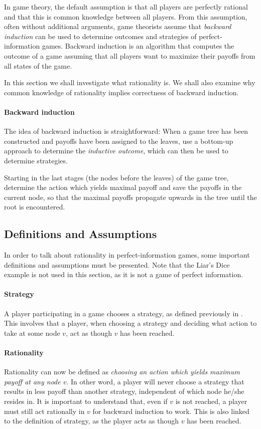 In game theory, the default assumption is that all players are perfectly rational and that this is common knowledge between all players. From this assumption, often without additional arguments, game theorists assume that \emph{backward induction} can be used to determine outcomes and strategies of perfect-information games. Backward induction is an algorithm that computes the outcome of a game assuming that all players want to maximize their payoffs from all states of the game.

In this section we shall investigate what rationality is. We shall also examine why common knowledge of rationality implies correctness of backward induction.

\paragraph*{Backward induction}
The idea of backward induction is straightforward: When a game tree has been constructed and payoffs have been assigned to the leaves, use a bottom-up approach to determine the \emph{inductive outcome}, which can then be used to determine strategies. 

Starting in the last stages (the nodes before the leaves) of the game tree, determine the action which yields maximal payoff and save the payoffs in the current node, so that the maximal payoffs propagate upwards in the tree until the root is encountered.

\subsection{Definitions and Assumptions}
In order to talk about rationality in perfect-information games, some important definitions and assumptions must be presented. Note that the Liar's Dice example is not used in this section, as it is not a game of perfect information.

\paragraph*{Strategy} A player participating in a game chooses a strategy, as defined previously in . This involves that a player, when choosing a strategy and deciding what action to take at some node $v$, act as though $v$ has been reached.

\paragraph*{Rationality} Rationality can now be defined as \textit{choosing an action which yields maximum payoff at any node $v$}. In other word, a player will never choose a strategy that results in less payoff than another strategy, independent of which node he/she resides in. 
It is important to understand that, even if $v$ is not reached, a player must still act rationally in $v$ for backward induction to work. This is also linked to the definition of strategy, as the player acts as though $v$ has been reached.

